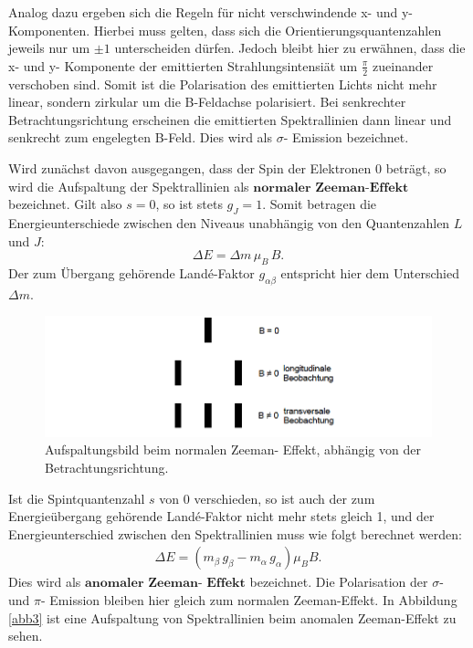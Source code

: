 \noindent Analog dazu ergeben sich die Regeln für nicht verschwindende x- und y- Komponenten.
Hierbei muss gelten, dass sich die Orientierungsquantenzahlen jeweils nur um
$\pm 1$ unterscheiden dürfen. Jedoch bleibt hier zu erwähnen, dass die x- und y- Komponente
der emittierten Strahlungsintensiät um $\frac{\pi}{2}$ zueinander verschoben sind.
Somit ist die Polarisation des emittierten Lichts nicht mehr linear, sondern zirkular
um die B-Feldachse polarisiert. Bei senkrechter Betrachtungsrichtung erscheinen die emittierten Spektrallinien
dann linear und senkrecht zum engelegten B-Feld.
Dies wird als $\sigma$- Emission bezeichnet.

\noindent Wird zunächst davon ausgegangen, dass der Spin der Elektronen 0 beträgt, so
wird die Aufspaltung der Spektrallinien als $\textbf{normaler Zeeman-Effekt}$ bezeichnet.
Gilt also $s=0$, so ist stets $g_J=1$. Somit betragen die Energieunterschiede zwischen
den Niveaus unabhängig von den Quantenzahlen $L$ und $J$:
\begin{equation}
	\Delta E = \Delta m \, \mu_{B} \, B.
\end{equation}
Der zum Übergang gehörende Landé-Faktor $g_{\alpha \beta}$ entspricht hier dem Unterschied
$\Delta m$.

\FloatBarrier
\begin{figure}
  \centering
  \includegraphics[scale=0.5]{normal2.PNG}
  \caption{Aufspaltungsbild beim normalen Zeeman- Effekt, abhängig von der Betrachtungsrichtung. \cite{Q1}}
  \label{abb2}
\end{figure}
\FloatBarrier

Ist die Spintquantenzahl $s$ von 0 verschieden, so ist auch der zum Energieübergang gehörende
Landé-Faktor nicht mehr stets gleich 1, und der Energieunterschied zwischen den Spektrallinien
muss wie folgt berechnet werden:
\begin{align*}
    \Delta E = (m_{\beta} \, g_{\beta} - m_{\alpha} \, g_{\alpha} )\mu_{B} B.
\end{align*}
Dies wird als $\textbf{anomaler Zeeman- Effekt}$ bezeichnet.
Die Polarisation der $\sigma$- und $\pi$- Emission bleiben hier gleich zum normalen
Zeeman-Effekt.
In Abbildung \ref{abb3} ist eine Aufspaltung von Spektrallinien beim anomalen Zeeman-Effekt zu sehen.

